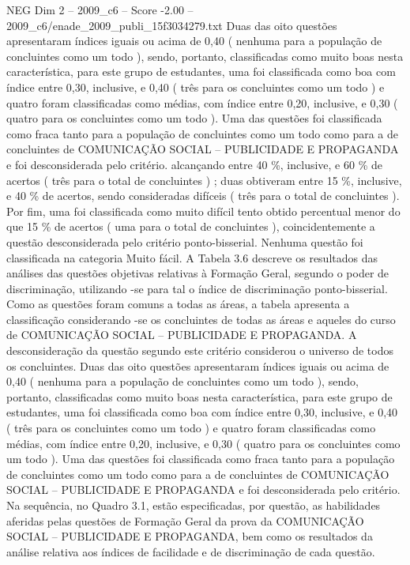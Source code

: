 \begin{textsample}{NEG Dim 2 – 2009\_c6 – Score -2.00 – 2009\_c6/enade\_2009\_publi\_15f3034279.txt}
Duas das oito questões apresentaram índices iguais ou acima de 0,40 ( nenhuma para a população de concluintes como um todo ), sendo, portanto, classificadas como muito boas nesta característica, para este grupo de estudantes, uma foi classificada como boa com índice entre 0,30, inclusive, e 0,40 ( três para os concluintes como um todo ) e quatro foram classificadas como médias, com índice entre 0,20, inclusive, e 0,30 ( quatro para os concluintes como um todo ).
Uma das questões foi classificada como fraca tanto para a população de concluintes como um todo como para a de concluintes de COMUNICAÇÃO SOCIAL – PUBLICIDADE E PROPAGANDA e foi desconsiderada pelo critério. alcançando entre 40 \%, inclusive, e 60 \% de acertos ( três para o total de concluintes ) ; duas obtiveram entre 15 \%, inclusive, e 40 \% de acertos, sendo consideradas difíceis ( três para o total de concluintes ).
Por fim, uma foi classificada como muito difícil tento obtido percentual menor do que 15 \% de acertos ( uma para o total de concluintes ), coincidentemente a questão desconsiderada pelo critério ponto-bisserial.
Nenhuma questão foi classificada na categoria Muito fácil.
A Tabela 3.6 descreve os resultados das análises das questões objetivas relativas à Formação Geral, segundo o poder de discriminação, utilizando -se para tal o índice de discriminação ponto-bisserial.
Como as questões foram comuns a todas as áreas, a tabela apresenta a classificação considerando -se os concluintes de todas as áreas e aqueles do curso de COMUNICAÇÃO SOCIAL – PUBLICIDADE E PROPAGANDA.
A desconsideração da questão segundo este critério considerou o universo de todos os concluintes.
Duas das oito questões apresentaram índices iguais ou acima de 0,40 ( nenhuma para a população de concluintes como um todo ), sendo, portanto, classificadas como muito boas nesta característica, para este grupo de estudantes, uma foi classificada como boa com índice entre 0,30, inclusive, e 0,40 ( três para os concluintes como um todo ) e quatro foram classificadas como médias, com índice entre 0,20, inclusive, e 0,30 ( quatro para os concluintes como um todo ).
Uma das questões foi classificada como fraca tanto para a população de concluintes como um todo como para a de concluintes de COMUNICAÇÃO SOCIAL – PUBLICIDADE E PROPAGANDA e foi desconsiderada pelo critério.
Na sequência, no Quadro 3.1, estão especificadas, por questão, as habilidades aferidas pelas questões de Formação Geral da prova da COMUNICAÇÃO SOCIAL – PUBLICIDADE E PROPAGANDA, bem como os resultados da análise relativa aos índices de facilidade e de discriminação de cada questão.

\end{textsample}
